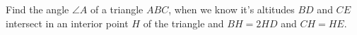 Find the angle $\angle A$ of a triangle $ABC$, when we know it's altitudes $BD$ and $CE$ intersect in an interior point $H$ of the triangle and $BH=2HD$ and $CH=HE$.